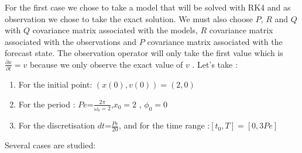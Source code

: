 \noindent For the first case we chose to take a model that will be solved with RK4 and as observation we chose to take the exact solution. We must also choose $P$, $R$ and $Q$ with $Q$ covariance matrix associated with the models, $R$ covariance matrix associated with the observations and $P$ covariance matrix associated with the forecast state.
The observation operator will only take the first value which is $\frac{\partial x}{\partial t}=v$ because we only observe the exact value of $v$ .
\newpage
\noindent Let's take :
\begin{enumerate}[label=\textbullet]
  \item For the initial point: $(x(0),v(0))=(2,0)$ 
  \item For the period : \; $Pe$=$\frac{2\pi}{\omega_0=2}$,\quad $x_0=2$ \quad, $\phi_0=0$ 
  \item For the discretisation $dt$=$\frac{Pe}{20}$, and for the time range :\quad $[t_0,T]=[0,3Pe]$
\end{enumerate}
\noindent\newline Several cases are studied:
